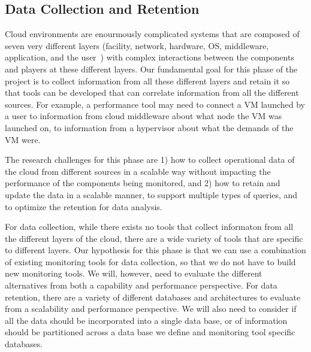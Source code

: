 \subsection{Data Collection and Retention}

Cloud environments are enourmously complicated systems that are composed of seven very different layers (facility, network, hardware, OS, middleware, application, and the user~\cite{spring2011monitoring}) with complex interactions between the components and players at these different layers.  Our fundamental goal for this phase of the project is to collect information from all these different layers and retain it so that tools can be developed that can correlate information from all the different sources.  For example, a performance tool may need to connect a VM launched by a user to information from cloud middleware about what node the VM was launched on, to information from a hypervisor about what the demands of the VM were. 


The research challenges for this phase are 1) how to collect operational data of the cloud from different sources in a scalable way without impacting the performance of the components being monitored, and 2)  how to retain and update the data in a scalable manner, to support multiple types of queries, and to optimize the retention for data analysis.

For data collection, while there exists no tools that collect informaton from all the different layers of the cloud, there are a wide variety of tools that are specific to different layers.  Our hypothesis for this phase is that we can use a combination of existing monitoring tools for data collection, so that we do not have to build new monitoring tools.  We will, however, need to evaluate the different alternatives from both a capability and performance perspective.  
For data retention, there are a variety of different databases and architectures to evaluate from a scalability and performance perspective.  We will also need to consider if all the data should be incorporated into a single data base, or of information should be partitioned across a data base we define and monitoring tool specific databases. 


